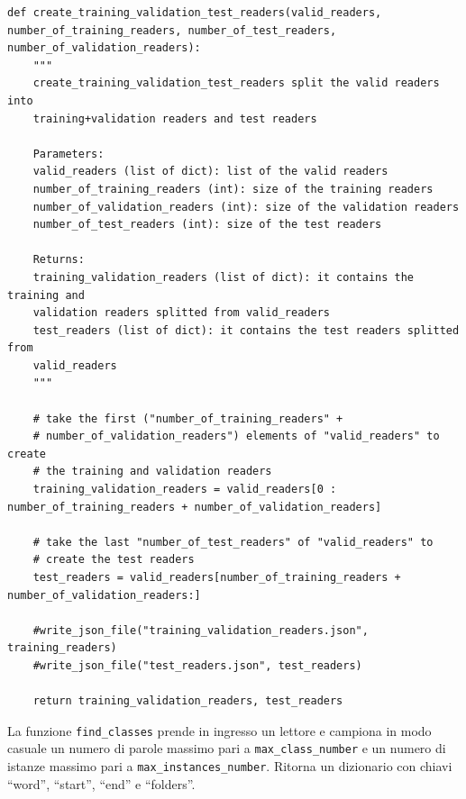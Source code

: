 \documentclass[12pt,a4paper,titlepage]{article}
\begin{document}
\begin{lstlisting}[language=iPython,firstnumber=68, caption=Funzione \texttt{create\_training\_validation\_test\_readers}, label=create_training_validation_test_readers,captionpos=b]
def create_training_validation_test_readers(valid_readers, number_of_training_readers, number_of_test_readers, number_of_validation_readers):
    """
    create_training_validation_test_readers split the valid readers into
    training+validation readers and test readers

    Parameters:
    valid_readers (list of dict): list of the valid readers
    number_of_training_readers (int): size of the training readers
    number_of_validation_readers (int): size of the validation readers
    number_of_test_readers (int): size of the test readers

    Returns:
    training_validation_readers (list of dict): it contains the training and
    validation readers splitted from valid_readers
    test_readers (list of dict): it contains the test readers splitted from 
    valid_readers
    """

    # take the first ("number_of_training_readers" + 
    # number_of_validation_readers") elements of "valid_readers" to create
    # the training and validation readers
    training_validation_readers = valid_readers[0 : number_of_training_readers + number_of_validation_readers]

    # take the last "number_of_test_readers" of "valid_readers" to
    # create the test readers
    test_readers = valid_readers[number_of_training_readers + number_of_validation_readers:]

    #write_json_file("training_validation_readers.json", training_readers)
    #write_json_file("test_readers.json", test_readers)

    return training_validation_readers, test_readers
\end{lstlisting}

La funzione \texttt{find\_classes} prende in ingresso un lettore e campiona in modo casuale un numero di parole massimo pari a \texttt{max\_class\_number} e un numero di istanze massimo pari a \texttt{max\_instances\_number}. Ritorna un dizionario con chiavi ``word'', ``start'', ``end'' e ``folders''.
\end{document}
